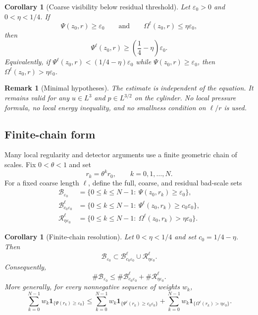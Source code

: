 \documentclass[10pt,a4paper]{amsart}
\numberwithin{equation}{section}
\newtheorem{corollary}[theorem]{Corollary}
\newtheorem{remark}[theorem]{Remark}
\newcommand{\eps}{\varepsilon}
\newcommand{\one}{\mathbf 1}
\begin{document}
\begin{corollary}[Coarse visibility below residual threshold]\label{cor:coarse-visibility}
Let $\eps_0>0$ and $0<\eta<1/4$.  If
\[
\Psi(z_0,r)\ge \eps_0
\qquad\text{and}\qquad
\Omega^\ell(z_0,r)\le \eta\eps_0,
\]
then
\begin{equation}\label{eq:coarse-lower-bound}
\Psi^\ell(z_0,r)
\ge
\left(\frac14-\eta\right)\eps_0.
\end{equation}
Equivalently, if $\Psi^\ell(z_0,r)<(1/4-\eta)\eps_0$ while $\Psi(z_0,r)\ge\eps_0$, then $\Omega^\ell(z_0,r)>\eta\eps_0$.
\end{corollary}

\begin{remark}[Minimal hypotheses]
The estimate is independent of the equation.  It remains valid for any $u\in L^3$ and $p\in L^{3/2}$ on the cylinder.  No local pressure formula, no local energy inequality, and no smallness condition on $\ell/r$ is used.
\end{remark}

\subsection{Finite-chain form}

Many local regularity and detector arguments use a finite geometric chain of scales.  Fix $0<\theta<1$ and set
\[
r_k=\theta^k r_0,
\qquad k=0,1,\dots,N.
\]
For a fixed coarse length $\ell$, define the full, coarse, and residual bad-scale sets
\begin{align*}
\mathcal B_{\eps_0}&=\{0\le k\le N-1:\ \Psi(z_0,r_k)\ge\eps_0\},\\
\mathcal B^\ell_{c_0\eps_0}&=\{0\le k\le N-1:\ \Psi^\ell(z_0,r_k)\ge c_0\eps_0\},\\
\mathcal R^\ell_{\eta\eps_0}&=\{0\le k\le N-1:\ \Omega^\ell(z_0,r_k)>\eta\eps_0\}.
\end{align*}

\begin{corollary}[Finite-chain resolution]\label{cor:finite-chain}
Let $0<\eta<1/4$ and set $c_0=1/4-\eta$.  Then
\begin{equation}\label{eq:bad-set-inclusion}
\mathcal B_{\eps_0}\subset
\mathcal B^\ell_{c_0\eps_0}\cup \mathcal R^\ell_{\eta\eps_0}.
\end{equation}
Consequently,
\begin{equation}\label{eq:bad-set-count}
\#\mathcal B_{\eps_0}
\le
\#\mathcal B^\ell_{c_0\eps_0}+
\#\mathcal R^\ell_{\eta\eps_0}.
\end{equation}
More generally, for every nonnegative sequence of weights $w_k$,
\begin{equation}\label{eq:weighted-bad-set}
\sum_{k=0}^{N-1}w_k\one_{\{\Psi(r_k)\ge\eps_0\}}
\le
\sum_{k=0}^{N-1}w_k\one_{\{\Psi^\ell(r_k)\ge c_0\eps_0\}}
+
\sum_{k=0}^{N-1}w_k\one_{\{\Omega^\ell(r_k)>\eta\eps_0\}}.
\end{equation}
\end{corollary}
\end{document}
